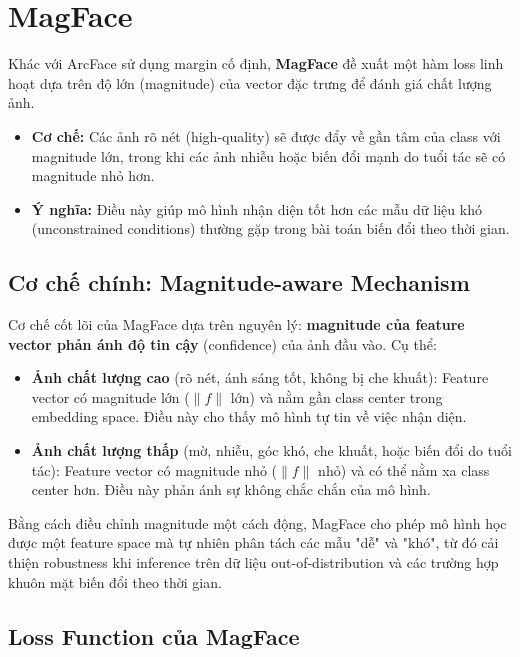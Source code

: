 
\section{MagFace}

Khác với ArcFace sử dụng margin cố định, \textbf{MagFace} đề xuất một hàm loss linh hoạt dựa trên độ lớn (magnitude) của vector đặc trưng để đánh giá chất lượng ảnh.

\begin{itemize}
    \item \textbf{Cơ chế:} Các ảnh rõ nét (high-quality) sẽ được đẩy về gần tâm của class với magnitude lớn, trong khi các ảnh nhiễu hoặc biến đổi mạnh do tuổi tác sẽ có magnitude nhỏ hơn.
    \item \textbf{Ý nghĩa:} Điều này giúp mô hình nhận diện tốt hơn các mẫu dữ liệu khó (unconstrained conditions) thường gặp trong bài toán biến đổi theo thời gian.
\end{itemize}

\subsection{Cơ chế chính: Magnitude-aware Mechanism}

Cơ chế cốt lõi của MagFace dựa trên nguyên lý: \textbf{magnitude của feature vector phản ánh độ tin cậy} (confidence) của ảnh đầu vào. Cụ thể:

\begin{itemize}
    \item \textbf{Ảnh chất lượng cao} (rõ nét, ánh sáng tốt, không bị che khuất): Feature vector có magnitude lớn ($\|f\|$ lớn) và nằm gần class center trong embedding space. Điều này cho thấy mô hình tự tin về việc nhận diện.
    
    \item \textbf{Ảnh chất lượng thấp} (mờ, nhiễu, góc khó, che khuất, hoặc biến đổi do tuổi tác): Feature vector có magnitude nhỏ ($\|f\|$ nhỏ) và có thể nằm xa class center hơn. Điều này phản ánh sự không chắc chắn của mô hình.
\end{itemize}

Bằng cách điều chỉnh magnitude một cách động, MagFace cho phép mô hình học được một feature space mà tự nhiên phân tách các mẫu "dễ" và "khó", từ đó cải thiện robustness khi inference trên dữ liệu out-of-distribution và các trường hợp khuôn mặt biến đổi theo thời gian.

\subsection{Loss Function của MagFace}

